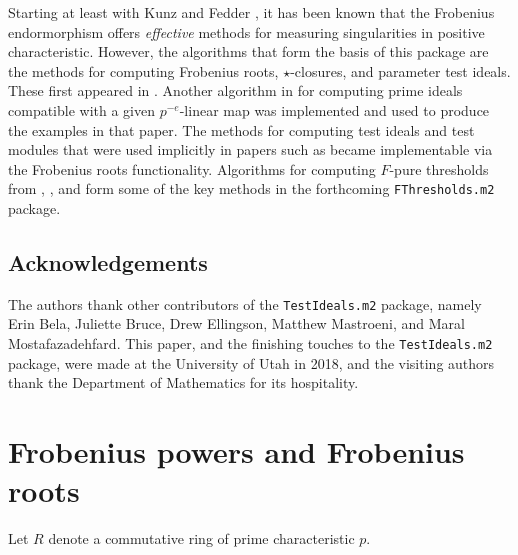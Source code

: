 \documentclass{amsart}
\begin{document}
Starting at least with Kunz \cite{KunzCharacterizationsOfRegularLocalRings} and Fedder \cite{FedderFPureRat}, it has been known that the Frobenius endormorphism offers \emph{effective} methods for measuring singularities in positive characteristic.
However, the algorithms that form the basis of this package are the methods for computing Frobenius roots, $\star$-closures, and parameter test ideals.
These first appeared in \cite{KatzmanParameterTestIdealOfCMRings,BlickleMustataSmithDiscretenessAndRationalityOfFThresholds,BlickleMustataSmithFThresholdsOfHypersurfaces,KatzmanFrobeniusMapsOnInjectiveHulls}.
Another algorithm in \cite{KatzmanSchwedeAlgorithm} for computing prime ideals compatible with a given $p^{-e}$-linear map was implemented and used to produce the examples in that paper.  The methods for computing test ideals and test modules that were used implicitly in papers such as \cite{BlickleSchwedeTakagiZhang,KatzmanLyubeznikZhangOnDiscretenessAndRationality,SchwedeTuckerTestIdealFiniteMaps} became implementable via the Frobenius roots functionality.
Algorithms for computing $F$-pure thresholds from \cite{HernandezFInvariantsOfDiagonalHyp}, \cite{HernandezFPureThresholdOfBinomial}, and \cite{HernandezTeixeiraFThresholdFunctions} form some of the key methods in the forthcoming \texttt{FThresholds.m2} package.

\subsection*{Acknowledgements}
The authors thank other contributors of the \texttt{TestIdeals.m2} package, namely
Erin Bela, Juliette Bruce, Drew Ellingson, Matthew Mastroeni, and Maral Mostafazadehfard.
This paper, and the finishing touches to the \texttt{TestIdeals.m2} package, were made at the University of Utah in 2018, and the visiting authors thank the Department of Mathematics for its hospitality.

\section{Frobenius powers and Frobenius roots}\label{Section: Frobenius powers and Frobenius roots}

Let $R$ denote a commutative ring of prime characteristic $p$.
\end{document}
